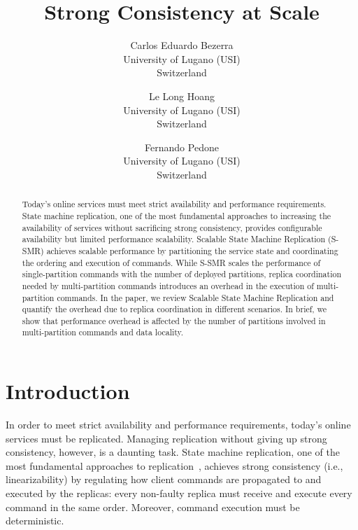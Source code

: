 \documentclass[11pt]{article}
\begin{document}
\title{Strong Consistency at Scale}

\author{
  Carlos Eduardo Bezerra\\
  University of Lugano (USI)\\
  Switzerland
  \and
  Le Long Hoang\\
  University of Lugano (USI)\\
  Switzerland
  \and
  Fernando Pedone\\
  University of Lugano (USI)\\
  Switzerland
}

\begin{abstract}
Today's online services must meet strict availability and performance requirements.
State machine replication, one of the most fundamental approaches to increasing the availability of services without sacrificing strong consistency, provides configurable availability but limited performance scalability.
Scalable State Machine Replication (S-SMR) achieves scalable performance by partitioning the service state and coordinating the ordering and execution of commands.
While S-SMR scales the performance of single-partition commands with the number of deployed partitions, replica coordination needed by multi-partition commands introduces an overhead in the execution of multi-partition commands.
In the paper, we review Scalable State Machine Replication and quantify the overhead due to replica coordination in different scenarios.
In brief, we show that performance overhead is affected by the number of partitions involved in multi-partition commands and data locality.
\end{abstract}

\maketitle

\section{Introduction}

In order to meet strict availability and performance requirements, today's online services must be replicated.
Managing replication without giving up strong consistency, however, is a daunting task.
State machine replication, one of the most fundamental approaches to replication~\cite{Lam78,Sch90}, achieves strong consistency (i.e., linearizability) by regulating how client commands are propagated to and executed by the replicas: every non-faulty replica must receive and execute every command in the same order. Moreover, command execution must be deterministic. 
\end{document}
